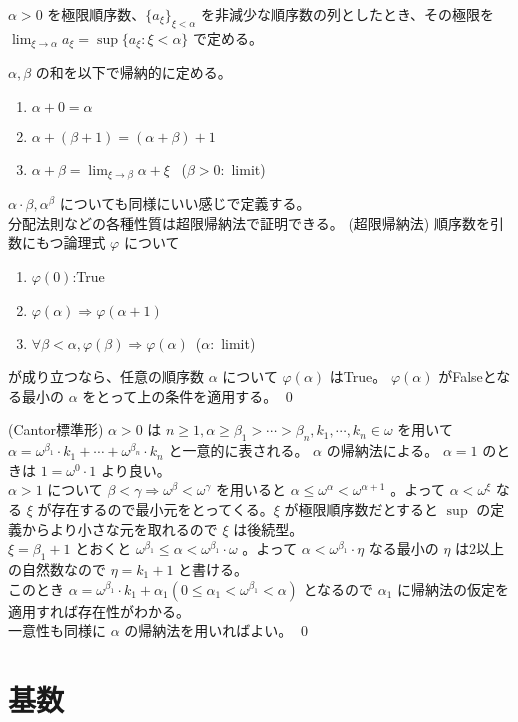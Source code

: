 \documentclass[dvipdfmx,a4paper]{jsreport}
\theoremstyle{definition}
\renewcommand{\phi}{\varphi}
\begin{document}
 $\alpha>0$ を極限順序数、$\{a_\xi\}_{\xi<\alpha}$ を非減少な順序数の列としたとき、その極限を $\lim_{\xi \to \alpha} a_{\xi}=\sup\{a_\xi \colon \xi<\alpha\}$ で定める。

 $\alpha,\beta$ の和を以下で帰納的に定める。
\begin{enumerate}
    \item $\alpha+0=\alpha$
    \item $\alpha+(\beta+1)=(\alpha+\beta)+1$
    \item $\alpha+\beta=\lim_{\xi \to \beta} \alpha+\xi$ \ ($\beta>0\colon$ limit)
\end{enumerate}
$\alpha \cdot \beta,\alpha^\beta$ についても同様にいい感じで定義する。 \\

分配法則などの各種性質は超限帰納法で証明できる。
\thm(超限帰納法) 順序数を引数にもつ論理式 $\phi$ について
\begin{enumerate}
    \item $\phi(0)$:True
    \item $\phi(\alpha) \Rightarrow \phi(\alpha+1)$
    \item $\forall \beta<\alpha,\phi(\beta) \Rightarrow \phi(\alpha)$\ ($\alpha\colon$ limit)
\end{enumerate}
が成り立つなら、任意の順序数 $\alpha$ について $\phi(\alpha)$ はTrue。
\prf  $\phi(\alpha)$ がFalseとなる最小の $\alpha$ をとって上の条件を適用する。 \qed

\thm\label{NormalForm}(Cantor標準形) $\alpha>0$ は $n \geq 1,\alpha \geq \beta_1>\cdots>\beta_n,k_1,\cdots,k_n \in \omega$ を用いて $\alpha=\omega^{\beta_1} \cdot k_1+\cdots +\omega^{\beta_n}\cdot k_n$ と一意的に表される。
\prf $\alpha$ の帰納法による。 $\alpha=1$ のときは $1=\omega^0\cdot 1$ より良い。\\
$\alpha>1$ について $\beta<\gamma \Rightarrow \omega^\beta<\omega^\gamma$ を用いると $\alpha \leq \omega^\alpha<\omega^{\alpha+1}$ 。よって $\alpha<\omega^\xi$ なる $\xi$ が存在するので最小元をとってくる。$\xi$ が極限順序数だとすると $\sup$ の定義からより小さな元を取れるので $\xi$ は後続型。 \\
$\xi=\beta_1+1$ とおくと $\omega^{\beta_1}\leq \alpha<\omega^{\beta_1}\cdot \omega$ 。よって $\alpha<\omega^{\beta_1}\cdot \eta$ なる最小の $\eta$ は2以上の自然数なので $\eta=k_1+1$ と書ける。 \\
このとき $\alpha=\omega^{\beta_1}\cdot k_1+\alpha_1(0 \leq \alpha_1<\omega^{\beta_1}<\alpha)$ となるので $\alpha_1$ に帰納法の仮定を適用すれば存在性がわかる。\\
一意性も同様に $\alpha$ の帰納法を用いればよい。 \qed

\chapter{基数}
\end{document}
